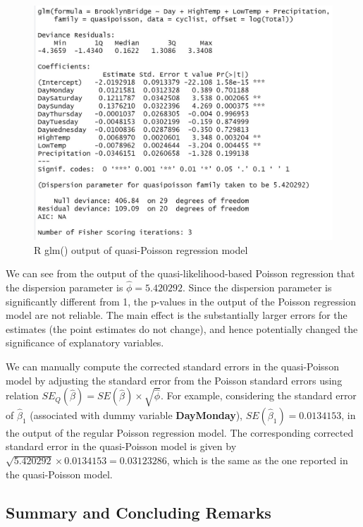 \documentclass[
]{book}
\begin{document}
\begin{figure}

{\centering \includegraphics[width=15.76in]{img10/w10-QuasiPoisOutput} 

}

\caption{R glm() output of quasi-Poisson regression model}\label{fig:unnamed-chunk-168}
\end{figure}

We can see from the output of the quasi-likelihood-based Poisson regression that the dispersion parameter is \(\hat{\phi} = 5.420292\). Since the dispersion parameter is significantly different from 1, the p-values in the output of the Poisson regression model are not reliable. The main effect is the substantially larger errors for the estimates (the point estimates do not change), and hence potentially changed the significance of explanatory variables.

We can manually compute the corrected standard errors in the quasi-Poisson model by adjusting the standard error from the Poisson standard errors using relation \(SE_Q(\hat{\beta})=SE(\hat{\beta})\times \sqrt{\hat{\phi}}\). For example, considering the standard error of \(\hat{\beta}_1\) (associated with dummy variable \textbf{DayMonday}), \(SE(\hat{\beta}_1) = 0.0134153\), in the output of the regular Poisson regression model. The corresponding corrected standard error in the quasi-Poisson model is given by \(\sqrt{5.420292}\times 0.0134153 = 0.03123286\), which is the same as the one reported in the quasi-Poisson model.

\hypertarget{summary-and-concluding-remarks}{%
\subsection{Summary and Concluding Remarks}\label{summary-and-concluding-remarks}}
\end{document}
